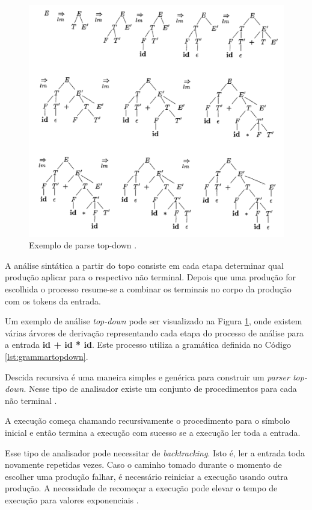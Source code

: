 \begin{figure}[h]
	\centering
	\includegraphics[keepaspectratio=true,scale=0.7]{figuras/parsetopdowntree.png}
	\caption{Exemplo de parse top-down \cite{aho2006}.}
	\label{fig:parsetopdowntree}
\end{figure}

A análise sintática a partir do topo consiste em cada etapa determinar qual produção 
aplicar para o respectivo não terminal. Depois que uma produção for escolhida
o processo resume-se a combinar os terminais no corpo da produção com os tokens da entrada.

Um exemplo de análise \textit{top-down} pode ser visualizado na Figura \ref{fig:parsetopdowntree},
onde existem várias árvores de derivação representando cada etapa do processo de análise para a 
entrada \textbf{id + id * id}. Este processo utiliza a gramática definida no Código \ref{lst:grammartopdown}.

Descida recursiva é uma maneira simples e genérica para construir um \textit{parser top-down}.
Nesse tipo de analisador existe um conjunto de procedimentos para cada não terminal \cite{aho2006}. 

A execução começa chamando recursivamente o procedimento para o símbolo inicial e então 
termina a execução com sucesso se a execução ler toda a entrada. 

Esse tipo de analisador pode necessitar de \textit{backtracking}. Isto é, ler a entrada toda
novamente repetidas vezes. Caso o caminho tomado durante o momento de escolher uma produção falhar,
é necessário reiniciar a execução usando outra produção. A necessidade de recomeçar a execução
pode elevar o tempo de execução para valores exponenciais \cite{aho2006}. 

